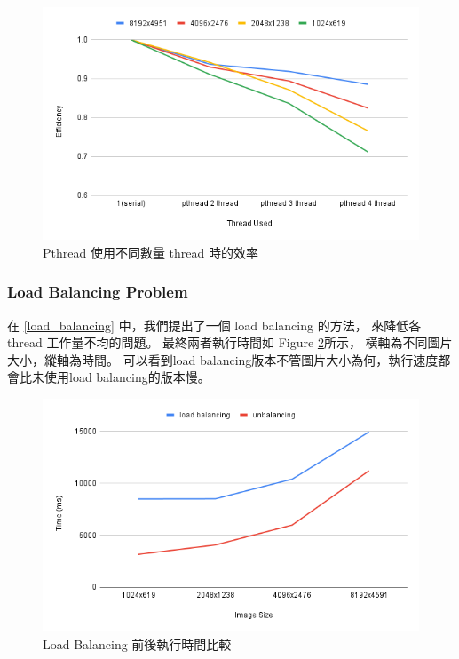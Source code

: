 \documentclass[sigconf,nonacm]{acmart}
\begin{document}
\begin{figure}[htbp]
  \centering
  \includegraphics[width=\linewidth]{"./image/pthread_efficiency.png"}
  \caption{Pthread 使用不同數量 thread 時的效率}
  \label{fig:pthread_efficiency}
\end{figure}

\subsubsection{Load Balancing Problem}

在 \ref{load_balancing} 中，我們提出了一個 load balancing 的方法，
來降低各 thread 工作量不均的問題。
最終兩者執行時間如 Figure \ref{fig:pthread_load_balancing}所示，
橫軸為不同圖片大小，縱軸為時間。
可以看到load balancing版本不管圖片大小為何，執行速度都會比未使用load balancing的版本慢。

\begin{figure}[htbp]
  \centering
  \includegraphics[width=\linewidth]{"./image/pthread_load_balance.png"}
  \caption{Load Balancing 前後執行時間比較}
  \label{fig:pthread_load_balancing}
\end{figure}
\end{document}
